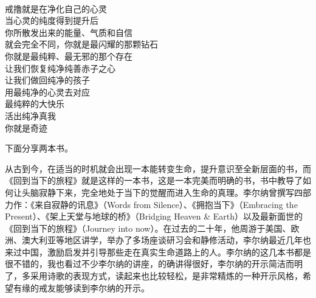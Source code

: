 \begin{poem}[纯净纯善赤子之心]
\begin{multicols}{2}
\begin{center}
            ~\\

            戒撸就是在净化自己的心灵 \\ 当心灵的纯度得到提升后 \\ 你所散发出来的能量、气质和自信 \\ 就会完全不同，你就是最闪耀的那颗钻石 \\ 你就是最纯粹、最无邪的那个存在 \\ 让我们恢复纯净纯善赤子之心 \\ 让我们做回纯净的孩子 \\ 用最纯净的心灵去对应 \\ 最纯粹的大快乐 \\ 活出纯净真我 \\ 你就是奇迹
        \end{center}
    \end{multicols}
\end{poem}

下面分享两本书。

\begin{book}
    从古到今，在适当的时机就会出现一本能转变生命，提升意识至全新层面的书，而《回到当下的旅程》就是这样的一本书，这是一本完美而明确的书，书中教导了如何让头脑寂静下来，完全地处于当下的觉醒而进入生命的真理。李尔纳曾撰写四部力作：《来自寂静的讯息》（Words from Silence）、《拥抱当下》（Embracing the Present）、《架上天堂与地球的桥》（Bridging Heaven \& Earth）以及最新面世的《回到当下的旅程》（Journey into now）。在过去的二十年，他周游于美国、欧洲、澳大利亚等地区讲学，举办了多场座谈研习会和静修活动，李尔纳最近几年也来过中国，激励启发并引导那些走在真实生命道路上的人。李尔纳的这几本书都是很不错的，我也看过不少李尔纳的讲座，的确讲得很好，李尔纳的开示简洁而明了，多采用诗歌的表现方式，读起来也比较轻松，是非常精炼的一种开示风格，希望有缘的戒友能够读到李尔纳的开示。
\end{book}



